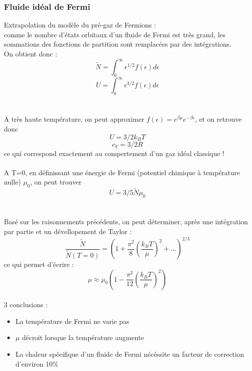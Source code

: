 \documentclass{article}
\begin{document}
        \subsubsection{Fluide idéal de Fermi}
            Extrapolation du modèle du pré-gaz de Fermions :\\ comme le nombre d'états orbitaux d'un fluide de Fermi est très grand, les sommations des fonctions de partition sont remplacées par des intégrations.\\
            On obtient donc :
            $$
            \tilde N = \int_{0}^{\infty} \epsilon^{1/2} f(\epsilon) d\epsilon
            $$
            $$
            U = \int_{0}^{\infty} \epsilon^{3/2} f(\epsilon) d\epsilon
            $$\\\\
            A très haute température, on peut approximer $f(\epsilon) = e^{\beta \mu} e^{- \beta \epsilon}$, et on retrouve donc
            $$
            U = 3/2 k_B T
            $$
            $$
            c_V = 3/2 R
            $$
            ce qui correspond exactement au compertement d'un gaz idéal classique ! \\\\
            A T=0, en définissant une énergie de Fermi (potentiel chimique à température nulle) $\mu_0$, on peut trouver
            $$
            U = 3/5 \tilde N \mu_0
            $$\\\\
            Basé sur les raisonnements précédents, on peut déterminer, après une intégration par partie et un dévellopement de Taylor : 
            $$
            \frac{\tilde N}{\tilde N (T = 0)} = (1 + \frac{\pi^2}{8}(\frac{k_B T}{\mu})^2 + ...)^{2/3}
            $$
            ce qui permet d'écrire :
            $$
            \mu \approx \mu_0 (1 - \frac{\pi^2}{12}(\frac{k_B T}{\mu})^2)
            $$\\
            3 conclusions :
            \begin{itemize}
                \item La température de Fermi ne varie pas
                \item $\mu$ décroit lorsque la température augmente
                \item La chaleur spécifique d'un fluide de Fermi nécéssite un facteur de correction d'environ 10\%
            \end{itemize}
\end{document}
